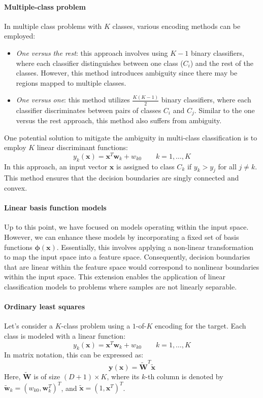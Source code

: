 \paragraph*{Multiple-class problem}
In multiple class problems with $K$ classes, various encoding methods can be employed:
\begin{itemize}
    \item \textit{One versus the rest}: this approach involves using $K-1$ binary classifiers, where each classifier distinguishes between one class ($C_i$) and the rest of the classes.
        However, this method introduces ambiguity since there may be regions mapped to multiple classes.
    \item \textit{One versus one}: this method utilizes $\frac{K(K-1)}{2}$ binary classifiers, where each classifier discriminates between pairs of classes $C_i$ and $C_j$. 
        Similar to the one versus the rest approach, this method also suffers from ambiguity.
\end{itemize}
One potential solution to mitigate the ambiguity in multi-class classification is to employ $K$ linear discriminant functions:
\[y_k(\textbf{x})=\textbf{x}^T\textbf{w}_k+w_{k0} \qquad k=1,\dots,K\]
In this approach, an input vector $\textbf{x}$ is assigned to class $C_k$ if $y_k>y_j$ for all $j \neq k$. 
This method ensures that the decision boundaries are singly connected and convex.

\paragraph*{Linear basis function models}
Up to this point, we have focused on models operating within the input space.
However, we can enhance these models by incorporating a fixed set of basis functions $\boldsymbol{\phi}(\textbf{x})$. 
Essentially, this involves applying a non-linear transformation to map the input space into a feature space. 
Consequently, decision boundaries that are linear within the feature space would correspond to nonlinear boundaries within the input space.
This extension enables the application of linear classification models to problems where samples are not linearly separable.

\paragraph*{Ordinary least squares}
Let's consider a $K$-class problem using a $1$-of-$K$ encoding for the target. 
Each class is modeled with a linear function:
\[y_k(\textbf{x})=\textbf{x}^T\textbf{w}_k+w_{k0} \qquad k=1,\dots,K\]
In matrix notation, this can be expressed as:
\[\textbf{y}(\textbf{x})=\tilde{\textbf{W}}^T\tilde{\textbf{x}}\]
Here, $\tilde{\textbf{W}}$ is of size $(D+1)\times K $, where its $k$-th column is denoted by $\tilde{\textbf{w}}_{k}={\left(w_{k0},\textbf{w}_k^T\right)}^T$, and $\tilde{\textbf{x}}={\left(1,\textbf{x}^T\right)}^T$. 

